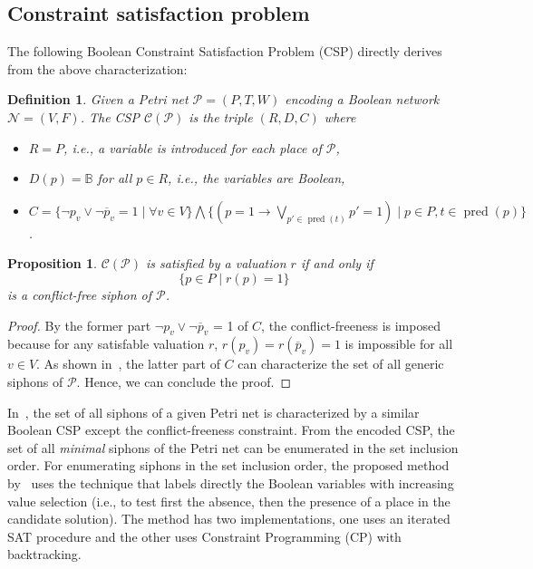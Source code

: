 \documentclass[preprint,12pt]{elsarticle}
\newtheorem{definition}{Definition}[section]
\newtheorem{proposition}{Proposition}[section]
\DeclareMathOperator{\pred}{pred}
\begin{document}
\subsection{Constraint satisfaction problem}%
\label{subsec:computation_csp}

The following Boolean Constraint Satisfaction Problem (CSP) directly derives from the above characterization:
\begin{definition}

  Given a Petri net \(\mathcal{P} = (P, T, W)\) encoding a Boolean network \(\mathcal{N} = (V, F)\).
  The CSP \(\mathcal{C}(\mathcal{P})\) is the triple \((R, D, C)\) where
  \begin{itemize}%
    \item \(R = P\), i.e., a variable is introduced for each place of \(\mathcal{P}\),
    \item \(D(p) = \mathbb{B}\) for all \(p \in R\), i.e., the variables are Boolean,
    \item \(C = \{\neg p_v \vee \neg \overline{p}_v = 1 \mid \forall v \in V\} \bigwedge
\{(p = 1 \rightarrow \bigvee_{p' \in \pred(t)}p' = 1) \mid p \in P, t \in \pred(p)\}\).
  \end{itemize}

\end{definition}

\begin{proposition}%
\label{prop:csp_conflict_free_siphon}
  \(\mathcal{C}(\mathcal{P})\) is satisfied by a valuation \(r\) if and only if
  \[
    \{p \in P \;|\; r(p) = 1\}\
  \]
  is a conflict-free siphon of \(\mathcal{P}\).

\end{proposition}

\begin{proof}

  By the former part \(\neg p_v \vee \neg \overline{p}_v\) = 1 of \(C\), the conflict-freeness is imposed because for any satisfable valuation \(r\), \(r(p_v) = r(\overline{p}_v) = 1\) is impossible for all \(v \in V\).
  As shown in~\cite{nabli2016enumerating}, the latter part of \(C\) can characterize the set of all generic siphons of \(\mathcal{P}\).
  Hence, we can conclude the proof.

\end{proof}

In~\cite{nabli2016enumerating}, the set of all siphons of a given Petri net is characterized by a similar Boolean CSP except the conflict-freeness constraint.
From the encoded CSP, the set of all \emph{minimal} siphons of the Petri net can be enumerated in the set inclusion order.
For enumerating siphons in the set inclusion order, the proposed method by~\cite{nabli2016enumerating} uses the technique that labels directly the Boolean variables with increasing value selection (i.e., to test first the absence, then the presence of a place in the candidate solution).
The method has two implementations, one uses an iterated SAT procedure and the other uses Constraint Programming (CP) with backtracking.
\end{document}
